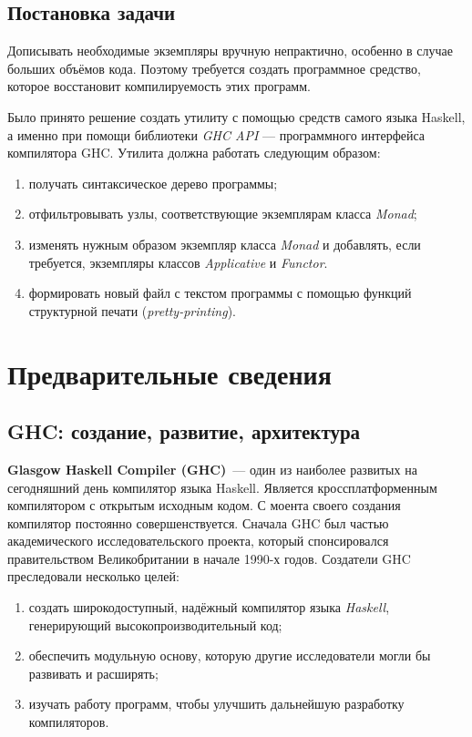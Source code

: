 \subsection*{Постановка задачи}
Дописывать необходимые экземпляры вручную непрактично, особенно в случае больших объёмов кода. Поэтому требуется создать программное средство, которое восстановит компилируемость этих программ.

Было принято решение создать утилиту с помощью средств самого языка Haskell, а именно при помощи библиотеки \textit{GHC API} --- программного интерфейса компилятора GHC. Утилита должна работать следующим образом:
\begin{enumerate}[1)]
\item получать синтаксическое дерево программы;
\item отфильтровывать узлы, соответствующие экземплярам класса \textit{Monad};
\item изменять нужным образом экземпляр класса \textit{Monad} и добавлять, если требуется, экземпляры классов \textit{Applicative} и \textit{Functor}.
\item формировать новый файл с текстом программы с помощью функций структурной печати (\textit{pretty-printing}).
\end{enumerate}


\newpage
\section{Предварительные сведения}
\label{sec:prelim}

\subsection{GHC: создание, развитие, архитектура}
\textbf{Glasgow Haskell Compiler (GHC)}~--- один из наиболее развитых на сегодняшний день компилятор языка Haskell. Является кроссплатформенным компилятором с открытым исходным кодом. С моента своего создания компилятор постоянно совершенствуется. Сначала GHC был частью академического исследовательского проекта, который спонсировался правительством Великобритании в начале 1990-х годов. Создатели GHC преследовали несколько целей:
\begin{enumerate}[1)]
\item создать широкодоступный, надёжный компилятор языка \textit{Haskell}, генерирующий высокопроизводительный код;
\item обеспечить модульную основу, которую другие исследователи могли бы развивать и расширять;
\item изучать работу программ, чтобы улучшить дальнейшую разработку компиляторов.
\end{enumerate}

